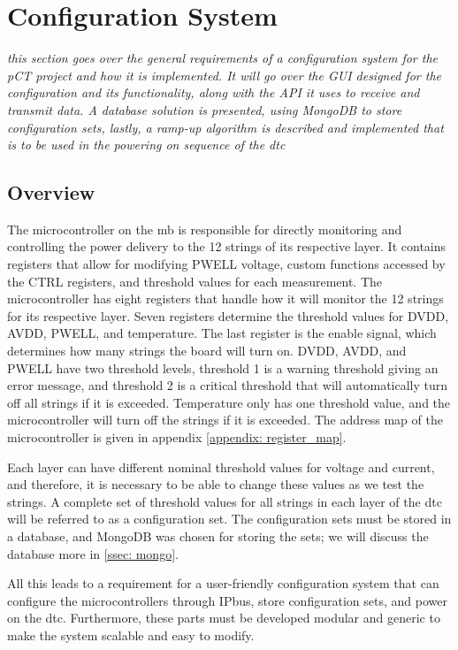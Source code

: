 \documentclass[main.tex]{subfiles}
\begin{document}
\section{Configuration System}
\label{section: configuration}
\textit{this section goes over the general requirements of a configuration system for the pCT project and how it is implemented. It will go over the GUI designed for the configuration and its functionality, along with the API it uses to receive and transmit data. A database solution is presented, using MongoDB to store configuration sets, lastly, a ramp-up algorithm is described and implemented that is to be used in the powering on sequence of the \gls{dtc} }



\subsection{Overview}
The microcontroller on the \gls{mb} is responsible for directly monitoring and controlling the power delivery to the 12 strings of its respective layer. It contains registers that allow for modifying PWELL voltage, custom functions accessed by the CTRL registers, and threshold values for each measurement. The microcontroller has eight registers that handle how it will monitor the 12 strings for its respective layer. Seven registers determine the threshold values for DVDD, AVDD, PWELL, and temperature. The last register is the enable signal, which determines how many strings the board will turn on. DVDD, AVDD, and PWELL have two threshold levels, threshold 1 is a warning threshold giving an error message, and threshold 2 is a critical threshold that will automatically turn off all strings if it is exceeded. Temperature only has one threshold value, and the microcontroller will turn off the strings if it is exceeded. The address map of the microcontroller is given in appendix \ref{appendix: register_map}.

Each layer can have different nominal threshold values for voltage and current, and therefore, it is necessary to be able to change these values as we test the strings. A complete set of threshold values for all strings in each layer of the \gls{dtc} will be referred to as a configuration set. The configuration sets must be stored in a database, and MongoDB was chosen for storing the sets; we will discuss the database more in \autoref{ssec: mongo}.

All this leads to a requirement for a user-friendly configuration system that can configure the microcontrollers through IPbus, store configuration sets, and power on the \gls{dtc}. Furthermore, these parts must be developed modular and generic to make the system scalable and easy to modify.
\end{document}
